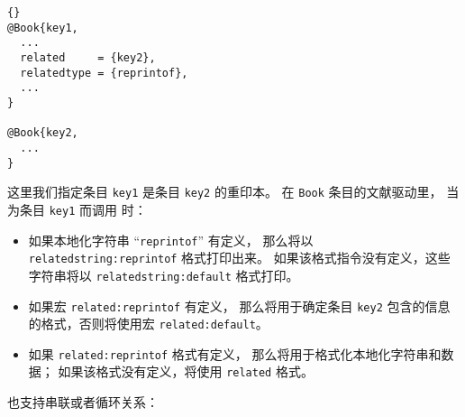 \begin{lstlisting}[style=bibtex]{}
@Book{key1,
  ...
  related     = {key2},
  relatedtype = {reprintof},
  ...
}

@Book{key2,
  ...
}
\end{lstlisting}
%
这里我们指定条目 \texttt{key1} 是条目 \texttt{key2} 的重印本。
在 \texttt{Book} 条目的文献驱动里，
当为条目 \texttt{key1} 而调用  时：

\begin{itemize}
\item %
如果本地化字符串 “\texttt{reprintof}” 有定义，
那么将以 \texttt{relatedstring:reprintof} 格式打印出来。
如果该格式指令没有定义，这些字符串将以 \texttt{relatedstring:default} 格式打印。
\item %
如果宏 \texttt{related:reprintof} 有定义，
那么将用于确定条目 \texttt{key2} 包含的信息的格式，否则将使用宏 \texttt{related:default}。
\item %
如果 \texttt{related:reprintof} 格式有定义，
那么将用于格式化本地化字符串和数据；
如果该格式没有定义，将使用 \texttt{related} 格式。
\end{itemize}
%
也支持串联或者循环关系：

